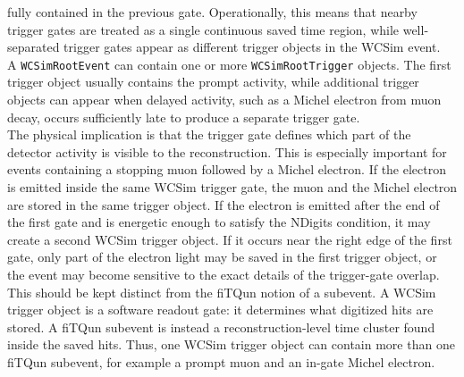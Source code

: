 \documentclass{article}
\numberwithin{table}{subsection}
\numberwithin{figure}{subsection}
\numberwithin{equation}{subsection}
\numberwithin{footnote}{subsection}
\begin{document}
fully contained in the previous gate. Operationally, this means that nearby
trigger gates are treated as a single continuous saved time region, while
well-separated trigger gates appear as different trigger objects in the WCSim
event.\\
\newline
A \texttt{WCSimRootEvent} can contain one or more
\texttt{WCSimRootTrigger} objects. The first trigger object usually contains
the prompt activity, while additional trigger objects can appear when delayed
activity, such as a Michel electron from muon decay, occurs sufficiently late
to produce a separate trigger gate. \\
The physical implication is that the trigger gate defines which part of the
detector activity is visible to the reconstruction. This is especially
important for events containing a stopping muon followed by a Michel
electron. If the electron is emitted inside the same WCSim trigger gate, the
muon and the Michel electron are stored in the same trigger object. If the
electron is emitted after the end of the first gate and is energetic enough to
satisfy the NDigits condition, it may create a second WCSim trigger object.
If it occurs near the right edge of the first gate, only part of the electron
light may be saved in the first trigger object, or the event may become
sensitive to the exact details of the trigger-gate overlap.\\
\newline
This should be kept distinct from the fiTQun notion of a subevent. A WCSim
trigger object is a software readout gate: it determines what digitized hits
are stored. A fiTQun subevent is instead a reconstruction-level time cluster
found inside the saved hits. Thus, one WCSim trigger object can contain more
than one fiTQun subevent, for example a prompt muon and an in-gate Michel
electron.
\end{document}
